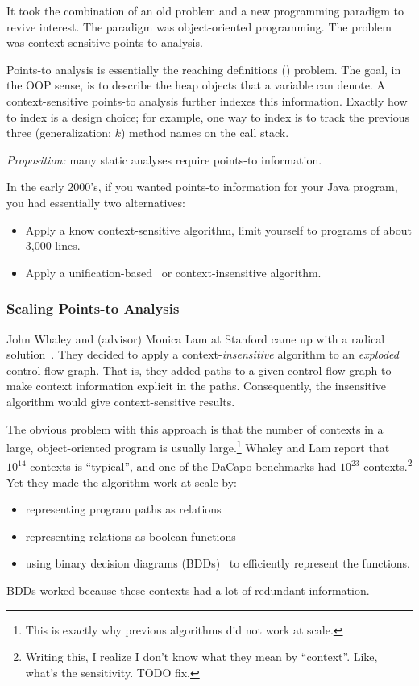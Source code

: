 \documentclass{article}
\begin{document}
It took the combination of an old problem and a new programming paradigm to revive interest.
The paradigm was object-oriented programming.
The problem was context-sensitive points-to analysis.

Points-to analysis is essentially the reaching definitions ({\rd}) problem.
The goal, in the OOP sense, is to describe the heap objects that a variable can denote.
A context-sensitive points-to analysis further indexes this information.
Exactly how to index is a design choice; for example, one way to index is to track the previous three (generalization: $k$) method names on the call stack.

\emph{Proposition:} many static analyses require points-to information.

In the early 2000's, if you wanted points-to information for your Java program, you had essentially two alternatives:
\begin{itemize}
\item Apply a know context-sensitive algorithm, limit yourself to programs of about 3,000 lines.
\item Apply a unification-based~\cite{s-popl-1995} or context-insensitive algorithm.
\end{itemize}


\subsubsection*{Scaling Points-to Analysis}

John Whaley and (advisor) Monica Lam at Stanford came up with a radical solution~\cite{wl-pldi-2004}.
They decided to apply a context-\emph{insensitive} algorithm to an \emph{exploded} control-flow graph.
That is, they added paths to a given control-flow graph to make context information explicit in the paths.
Consequently, the insensitive algorithm would give context-sensitive results.

The obvious problem with this approach is that the number of contexts in a large, object-oriented program is usually large.\footnote{This is exactly why previous algorithms did not work at scale.}
Whaley and Lam report that $10^14$ contexts is ``typical'', and one of the DaCapo benchmarks had $10^23$ contexts.\footnote{Writing this, I realize I don't know what they mean by ``context''. Like, what's the sensitivity. TODO fix.}
Yet they made the algorithm work at scale by:
\begin{itemize}
\item representing program paths as relations
\item representing relations as boolean functions
\item using binary decision diagrams (BDDs)~\cite{a-ieee-1978} to efficiently represent the functions.
\end{itemize}
\noindent BDDs worked because these contexts had a lot of redundant information.
\end{document}
